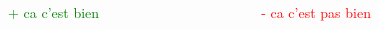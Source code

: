 \begin{frame}
\begin{columns}
                \begin{column}{.4\linewidth}
                    \pause
                    \\
                    \pause
                    \pause
                    \begin{columns}
                        \begin{column}{.5\linewidth}
                            \textcolor{green}{+ ca c'est bien}
                        \end{column}

                        \begin{column}{.5\linewidth}
                            \textcolor{red}{- ca c'est pas bien}
                        \end{column}
                    \end{columns}
                \end{column}
            \end{columns}
        \end{frame}

